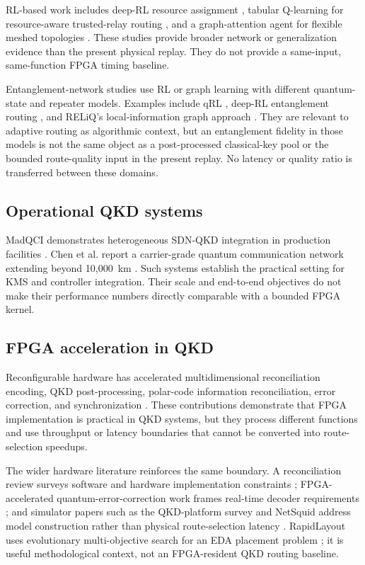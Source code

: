 RL-based work includes deep-RL resource assignment
\cite{sharma2023drl}, tabular Q-learning for resource-aware trusted-relay routing
\cite{hao2025qlearning}, and a graph-attention agent for flexible meshed topologies
\cite{johann2026adaptive}. These studies provide broader network or generalization
evidence than the present physical replay. They do not provide a same-input,
same-function FPGA timing baseline.

Entanglement-network studies use RL or graph learning with different quantum-state
and repeater models. Examples include qRL \cite{abreu2024qrl}, deep-RL
entanglement routing \cite{le2022entanglement}, and RELiQ's local-information graph
approach \cite{meuser2026reliq}. They are relevant to adaptive routing as algorithmic
context, but an entanglement fidelity in those models is not the same object as a
post-processed classical-key pool or the bounded route-quality input in the present
replay. No latency or quality ratio is transferred between these domains.

\subsection{Operational QKD systems}

MadQCI demonstrates heterogeneous SDN-QKD integration in production facilities
\cite{martin2024madqci}. Chen et al. report a carrier-grade quantum communication
network extending beyond 10,000~km \cite{chen2025carrier}. Such systems establish
the practical setting for KMS and controller integration. Their scale and end-to-end
objectives do not make their performance numbers directly comparable with a bounded
FPGA kernel.

\subsection{FPGA acceleration in QKD}

Reconfigurable hardware has accelerated multidimensional reconciliation encoding,
QKD post-processing, polar-code information reconciliation, error correction, and
synchronization
\cite{lu2023multidimensional,venkatachalam2023postprocessing,liao2025polar,
wei2025fptems,chandra2025synchronization}. These contributions demonstrate that FPGA
implementation is practical in QKD systems, but they process different functions
and use throughput or latency boundaries that cannot be converted into route-selection
speedups.

The wider hardware literature reinforces the same boundary. A reconciliation
review surveys software and hardware implementation constraints
\cite{yang2023reconciliation}; FPGA-accelerated quantum-error-correction work frames
real-time decoder requirements \cite{branchini2023hitchhiker}; and simulator papers
such as the QKD-platform survey and NetSquid address model construction rather than
physical route-selection latency \cite{aji2021simulation,coopmans2021netsquid}.
RapidLayout uses evolutionary multi-objective search for an EDA placement problem
\cite{zhang2022rapidlayout}; it is useful methodological context, not an
FPGA-resident QKD routing baseline.


